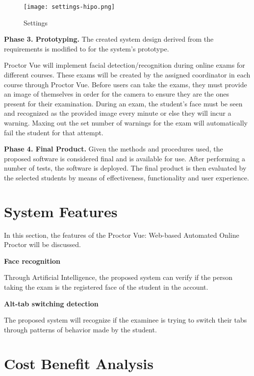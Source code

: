 \vspace{1cm}

\begin{figure}[h!]
   \begin{center}
      \texttt{[image: settings-hipo.png]}
      \caption{Settings}
   \end{center}
\end{figure}

\textbf{Phase 3. Prototyping.}
The created system design derived from the requirements is modified to for the system’s prototype.

Proctor Vue will implement facial detection/recognition during online exams for different courses.
These exams will be created by the assigned coordinator in each course through Proctor Vue.
Before users can take the exams, they must provide an image of themselves in order for the camera to ensure they are the ones present for their examination.
During an exam, the student’s face must be seen and recognized as the provided image every minute or else they will incur a warning.
Maxing out the set number of warnings for the exam will automatically fail the student for that attempt.

\textbf{Phase 4. Final Product.}
Given the methods and procedures used, the proposed software is considered final and is available for use.
After performing a number of tests, the software is deployed.
The final product is then evaluated by the selected students by means of effectiveness, functionality and user experience.

\section{System Features}

In this section, the features of the Proctor Vue: Web-based Automated Online Proctor will be discussed.

\textbf{Face recognition}

Through Artificial Intelligence, the proposed system can verify if the person taking the exam is the registered face of the student in the account.

\textbf{Alt-tab switching detection}

The proposed system will recognize if the examinee is trying to switch their tabs through patterns of behavior made by the student.

\section{Cost Benefit Analysis}

